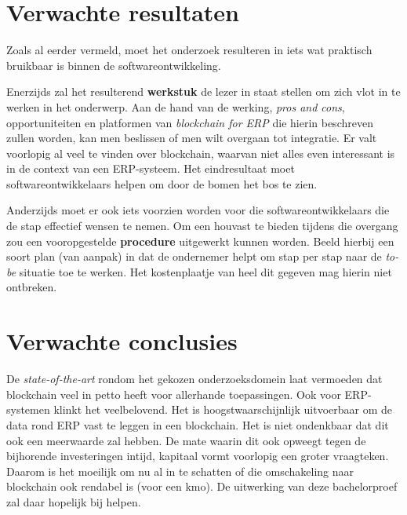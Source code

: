 \section{Verwachte resultaten}
\label{sec:verwachte_resultaten}

Zoals al eerder vermeld, moet het onderzoek resulteren in iets wat praktisch bruikbaar is binnen de softwareontwikkeling. 

Enerzijds zal het resulterend \textbf{werkstuk} de lezer in staat stellen om zich vlot in te werken in het onderwerp. Aan de hand van de werking, \textit{pros and cons}, opportuniteiten en platformen van \textit{blockchain for ERP} die hierin beschreven zullen worden, kan men beslissen of men wilt overgaan tot integratie. Er valt voorlopig al veel te vinden over blockchain, waarvan niet alles even interessant is in de context van een ERP-systeem. Het eindresultaat moet softwareontwikkelaars helpen om door de bomen het bos te zien.

Anderzijds moet er ook iets voorzien worden voor die softwareontwikkelaars die de stap effectief wensen te nemen. Om een houvast te bieden tijdens die overgang zou een vooropgestelde \textbf{procedure} uitgewerkt kunnen worden. Beeld hierbij een soort plan (van aanpak) in dat de ondernemer helpt om stap per stap naar de \textit{to-be} situatie toe te werken. Het kostenplaatje van heel dit gegeven mag hierin niet ontbreken.


\section{Verwachte conclusies}
\label{sec:verwachte_conclusies}

De \emph{state-of-the-art} rondom het gekozen onderzoeksdomein laat vermoeden dat blockchain veel in petto heeft voor allerhande toepassingen. Ook voor ERP-systemen klinkt het veelbelovend. Het is hoogstwaarschijnlijk uitvoerbaar om de data rond ERP vast te leggen in een blockchain. Het is niet ondenkbaar dat dit ook een meerwaarde zal hebben. De mate waarin dit ook opweegt tegen de bijhorende investeringen intijd, kapitaal vormt voorlopig een groter vraagteken. Daarom is het moeilijk om nu al in te schatten of die omschakeling naar blockchain ook rendabel is (voor een kmo). De uitwerking van deze bachelorproef zal daar hopelijk bij helpen.

